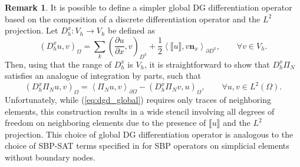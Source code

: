\documentclass[preprint,10pt]{article}
\theoremstyle{definition}
\theoremstyle{lemma}
\newtheorem{lemma}{Lemma}
\newtheorem*{remark}{Remark}
\theoremstyle{theorem}
\theoremstyle{assumption}
\newcommand{\pd}[2]{\frac{\partial#1}{\partial#2}}
\newcommand{\LRp}[1]{\left( #1 \right)}
\newcommand{\LRa}[1]{\left\langle #1 \right\rangle}
\newcommand{\jump}[1] {\ensuremath{\llbracket#1\rrbracket}}
\renewcommand{\L}{L^2\LRp{\Omega}}
\newcommand{\note}[1]{{\color{blue}{#1}}}
\begin{document}

\begin{remark}
It is possible to define a simpler global DG differentiation operator based on the composition of a discrete differentiation operator and the $L^2$ projection.  Let ${D}^x_h: V_h\rightarrow V_h$ be defined as
\[
\LRp{D^x_h u,v}_{\Omega} = \sum_k \LRp{\pd{u}{x},v}_{D^k} + \frac{1}{2}\LRa{\jump{u},v\bm{n}_x}_{\partial D^k}, \qquad \forall v \in V_h.
\]
Then, using that the range of $D^x_h$ is $V_h$, it is straightforward to show that $D^x_h \Pi_N$ satisfies an analogue of integration by parts, such that
\[
\LRp{D^x_h\Pi_N u, v}_{\Omega} = \LRa{\Pi_N u,v}_{\partial \Omega} - \LRp{D^x_h\Pi_N v, u}_{\Omega}, \qquad \forall u,v\in \L.
\]
Unfortunately, while (\ref{eq:dgd_global}) requires only traces of neighboring elements, this construction results in a wide stencil involving all degrees of freedom on neighboring elements due to the presence of $\jump{u}$ and the $L^2$ projection.  This choice of global DG differentiation operator is analogous to the choice of SBP-SAT terms specified in \cite{fernandez2016simultaneous} for SBP operators on simplicial elements without boundary nodes.  
\end{remark}


\note{It's currently unclear how to distinguish whether different operators are high order accurate. }
\end{document}
